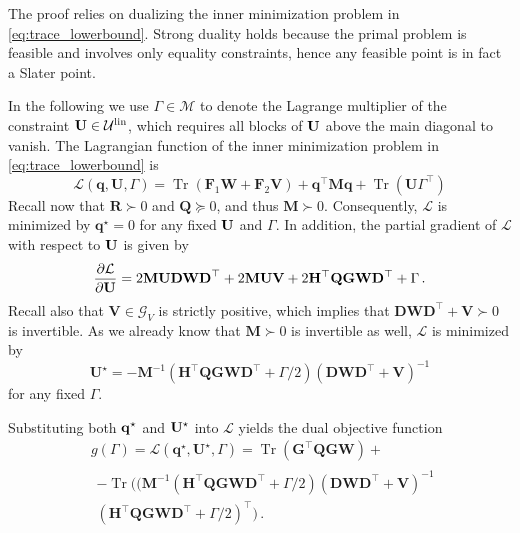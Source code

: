 \documentclass[letterpaper, 10 pt, conference]{ieeeconf}  %
\makeatletter
\renewenvironment{proof}[1][\proofname]{\par
  \pushQED{\qed}%
  \normalfont \topsep\z@
  \trivlist
  \item[\hskip2em
        \itshape
    #1\@addpunct{:}]\ignorespaces
}{%
  \popQED\endtrivlist\@endpefalse
}
\theoremstyle{ieeeconf}
\DeclareMathOperator{\Tr}{Tr}
\makeatother
\begin{document}
\begin{proof}
The proof relies on dualizing the inner minimization problem in \eqref{eq:trace_lowerbound}. Strong duality holds because the primal problem is feasible and involves only equality constraints, hence any feasible point is in fact a Slater point.

In the following we use $\Gamma \in \mathcal{M}$ to denote the Lagrange multiplier of the constraint $\bf U \in \mathcal{U}^{\text{lin}}$, 
which requires all blocks of $\bf U$ above the main diagonal to vanish. 
\noindent
The Lagrangian function of the inner minimization problem in \eqref{eq:trace_lowerbound} is
\begin{equation*}
\mathcal{L}(\mathbf{q}, \mathbf{U}, \Gamma) 
= \Tr\left(\mathbf{F}_{1} \mathbf{W}+\mathbf{F}_{2} \mathbf{V}\right)+\mathbf{q}^{\top} \mathbf{M} \mathbf{q} + \Tr(\mathbf{U}\Gamma^\top)
\end{equation*}
\noindent
Recall now that $\mathbf{R} \succ 0$ and $\mathbf{Q} \succeq 0$, and thus $\mathbf{M} \succ 0$. 
Consequently, $\mathcal{L}$ is minimized by $\mathbf{q}^{\star} = 0$ for any fixed $\bf U$ and $\Gamma$. 
In addition, the partial gradient of $\mathcal{L}$ with respect to $\bf U$ is given by
\[
\frac{\partial \mathcal{L}}{\partial \bf U}
= 2 \mathbf{M U D W D}^{\top} 
 + 2 \mathbf{M U V}
 + 2 \mathbf{H^\top QGWD^\top} + \Gamma\,.
\]
\noindent
Recall also that $\mathbf{V} \in \mathcal{G}_{V}$ is strictly positive, which implies that $\mathbf{D W D^{\top} }+ \mathbf{V} \succ 0$ is invertible. 
As we already know that $\mathbf{M}\succ 0$ is invertible as well, 
$\mathcal{L}$ is minimized by
\[
\mathbf{U}^{\star} 
= -\mathbf{M}^{-1} 
   (\mathbf{H^{\top} Q G W D^{\top}} + \Gamma/2)
   (\mathbf{D W D^{\top} + V})^{-1}
\]
for any fixed $\Gamma$.

\noindent
Substituting both $\bf q^{\star}$ and $\bf U^{\star}$ into $\mathcal{L}$ yields the dual objective function
\[
\begin{aligned}
&g(\Gamma)
= \mathcal{L}(\mathbf{q^{\star}, U}^{\star}, \Gamma)
= \Tr(\mathbf{G^{\top} Q G W})+
\\
&
\begin{multlined}
- \Tr\Big(
    (\mathbf{M}^{-1}
    (\mathbf{H^{\top} Q G W D^{\top}} + \Gamma/2)
    (\mathbf{D W D^{\top} + V})^{-1}
    \\
    (\mathbf{H^{\top} Q G W D^{\top}} + \Gamma/2)^{\top}
   \Big)\,.
\end{multlined}
\end{aligned}
\]


\end{proof}
\end{document}
